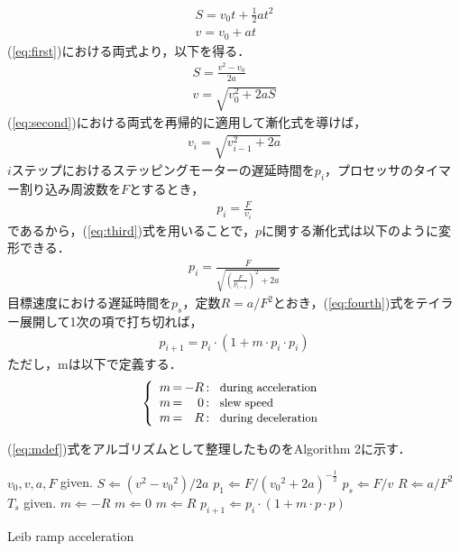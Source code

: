 \documentclass[twocolumn,oneside,a4paper]{article}
\begin{document}
\begin{eqnarray}\label{eq:first}
	S = v_0 t + \frac{1}{2} a t^2 \nonumber \\
	v = v_0 + a t	
\end{eqnarray}
(\ref{eq:first})における両式より，以下を得る．
\begin{eqnarray}\label{eq:second}
	S = \frac{v^2-v_0}{2 a} \nonumber \\
	v = \sqrt{v_0^2+2aS}
\end{eqnarray}
(\ref{eq:second})における両式を再帰的に適用して漸化式を導けば，
\begin{eqnarray}\label{eq:third}
	v_i = \sqrt{v_{i-1}^2 + 2a}
\end{eqnarray}
$i$ステップにおけるステッピングモーターの遅延時間を$p_i$，プロセッサのタイマー割り込み周波数を$F$とするとき，
\begin{eqnarray*}
	p_i = \frac{F}{v_i}
\end{eqnarray*}
であるから，(\ref{eq:third})式を用いることで，$p$に関する漸化式は以下のように変形できる．
\begin{eqnarray}\label{eq:fourth}
	p_i = \frac{F}{\sqrt{{(\frac{F}{p_{i-1}})}^2+2a}} 
\end{eqnarray}
目標速度における遅延時間を$p_s$，定数$R= a/F^2$とおき，(\ref{eq:fourth})式をテイラー展開して1次の項で打ち切れば，
\begin{eqnarray}\label{eq:pupdate}
	p_{i+1} = p_i \cdot (1 + m \cdot p_i \cdot p_i) 
\end{eqnarray}
ただし，mは以下で定義する．
\begin{eqnarray}\label{eq:mdef}
\left\{
\begin{array}{r@{\,}c@{\,}r@{\,}c@{\,}l@{\;\;}r}
 m &=& -R &:& \:\:\: \mbox{\small during acceleration}\\
 m &=& 0 &:&  \:\:\: \mbox{\small slew speed}\\
 m &=& R &:&  \:\:\: \mbox{\small during deceleration}
\end{array}%
\right.
\end{eqnarray}

(\ref{eq:mdef})式をアルゴリズムとして整理したものをAlgorithm 2に示す．

\begin{algorithm}         
\begin{algorithmic}                  
\STATE $v_0, v, a, F$ given.
\STATE $S \Leftarrow (v^2-{v_0}^2) / 2 a$
\STATE $p_1 \Leftarrow F / ({v_0}^2 + 2a)^{-\frac{1}{2}}$
\STATE $p_s \Leftarrow F/v$
\STATE $R \Leftarrow a / F^2$
\STATE $T_s$ given.
  \STATE $m \Leftarrow -R$
  \STATE $m \Leftarrow 0$
\ELSE
  \STATE $m \Leftarrow R$
\ENDIF
\STATE $p_{i+1} \Leftarrow p_i \cdot (1+m\cdot p \cdot p)$
\ENDFOR
\end{algorithmic}
\caption{Leib ramp acceleration}
\label{fig:leib_algorithm}                          

\end{algorithm}
\end{document}
